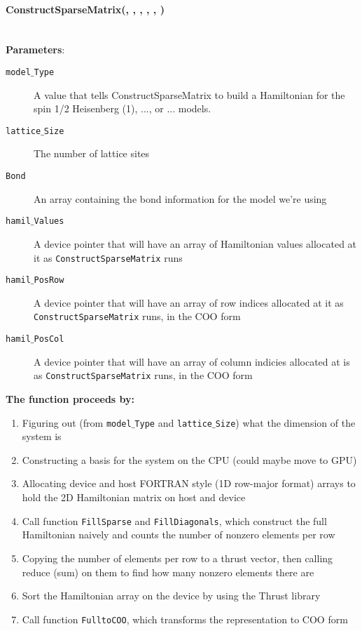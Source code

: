 \documentclass{article}
\begin{document}
\paragraph{\host \int ConstructSparseMatrix(\int, \int, \ptrint, \cuDoubleComplex, \ptrint, \ptrint) \\ \\}
\noindent\textbf{Parameters}:
\begin{description}
\item[\int \texttt{model$\_$Type}] A value that tells ConstructSparseMatrix to build a Hamiltonian for the spin 1/2 Heisenberg (1), ..., or ... models.
\item[\int \texttt{lattice$\_$Size}] The number of lattice sites
\item[\ptrint \texttt{Bond}] An array containing the bond information for the model we're using 
\item[\cuDoubleComplex \texttt{hamil$\_$Values}] A device pointer that will have an array of Hamiltonian values allocated at it as \texttt{ConstructSparseMatrix} runs
\item[\ptrint \texttt{hamil$\_$PosRow}] A device pointer that will have an array of row indices allocated at it as \texttt{ConstructSparseMatrix} runs, in the COO form
\item[\ptrint \texttt{hamil$\_$PosCol}] A device pointer that will have an array of column indicies allocated at is as \texttt{ConstructSparseMatrix} runs, in the COO form
\end{description}

\noindent\textbf{The function proceeds by:}
\begin{enumerate}
\item{Figuring out (from \texttt{model$\_$Type} and \texttt{lattice$\_$Size}) what the dimension of the system is}
\item{Constructing a basis for the system on the CPU (could maybe move to GPU)}
\item{Allocating device and host FORTRAN style (1D row-major format) arrays to hold the 2D Hamiltonian matrix on host and device}
\item{Call function \texttt{FillSparse} and \texttt{FillDiagonals}, which construct the full Hamiltonian naively and counts the number of nonzero elements per row}
\item{Copying the number of elements per row to a thrust vector, then calling reduce (sum) on them to find how many nonzero elements there are}
\item{Sort the Hamiltonian array on the device by using the Thrust library}
\item{Call function \texttt{FulltoCOO}, which transforms the representation to COO form}
\end{enumerate}
\end{document}
